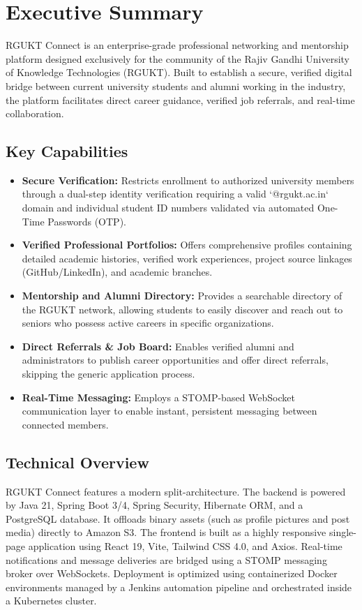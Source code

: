 \documentclass[11pt,a4paper,oneside]{report}
\begin{document}
\chapter*{Executive Summary}

RGUKT Connect is an enterprise-grade professional networking and mentorship platform designed exclusively for the community of the Rajiv Gandhi University of Knowledge Technologies (RGUKT). Built to establish a secure, verified digital bridge between current university students and alumni working in the industry, the platform facilitates direct career guidance, verified job referrals, and real-time collaboration.

\section*{Key Capabilities}
\begin{itemize}
    \item \textbf{Secure Verification:} Restricts enrollment to authorized university members through a dual-step identity verification requiring a valid `@rgukt.ac.in` domain and individual student ID numbers validated via automated One-Time Passwords (OTP).
    \item \textbf{Verified Professional Portfolios:} Offers comprehensive profiles containing detailed academic histories, verified work experiences, project source linkages (GitHub/LinkedIn), and academic branches.
    \item \textbf{Mentorship and Alumni Directory:} Provides a searchable directory of the RGUKT network, allowing students to easily discover and reach out to seniors who possess active careers in specific organizations.
    \item \textbf{Direct Referrals \& Job Board:} Enables verified alumni and administrators to publish career opportunities and offer direct referrals, skipping the generic application process.
    \item \textbf{Real-Time Messaging:} Employs a STOMP-based WebSocket communication layer to enable instant, persistent messaging between connected members.
\end{itemize}

\section*{Technical Overview}
RGUKT Connect features a modern split-architecture. The backend is powered by Java 21, Spring Boot 3/4, Spring Security, Hibernate ORM, and a PostgreSQL database. It offloads binary assets (such as profile pictures and post media) directly to Amazon S3. The frontend is built as a highly responsive single-page application using React 19, Vite, Tailwind CSS 4.0, and Axios. Real-time notifications and message deliveries are bridged using a STOMP messaging broker over WebSockets. Deployment is optimized using containerized Docker environments managed by a Jenkins automation pipeline and orchestrated inside a Kubernetes cluster.
\end{document}
